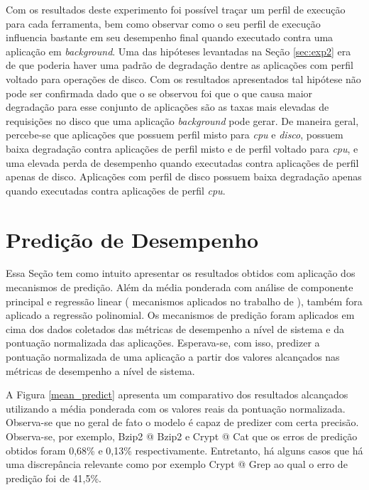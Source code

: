 Com os resultados deste experimento foi possível traçar um perfil de execução para cada ferramenta, bem como observar como o seu perfil de execução influencia bastante em seu desempenho final quando executado contra uma aplicação em \textit{background}. Uma das hipóteses levantadas na Seção \ref{sec:exp2} era de que poderia haver uma padrão de degradação dentre as aplicações com perfil voltado para operações de disco. Com os resultados apresentados tal hipótese não pode ser confirmada dado que o se observou foi que o que causa maior degradação para esse conjunto de aplicações são as taxas mais elevadas de requisições no disco que uma aplicação \textit{background} pode gerar. De maneira geral, percebe-se que aplicações que possuem perfil misto para \textit{cpu} e \textit{disco}, possuem baixa degradação contra aplicações de perfil misto e de perfil voltado para \textit{cpu}, e uma elevada perda de desempenho quando executadas contra aplicações de perfil apenas de disco. Aplicações com perfil de disco possuem baixa degradação apenas quando executadas contra aplicações de perfil \textit{cpu}. 

\section{Predição de Desempenho}
\label{sec:performance_predict} 
Essa Seção tem como intuito apresentar os resultados obtidos com aplicação dos mecanismos de predição. Além da média ponderada com análise de componente principal e regressão linear ( mecanismos aplicados no trabalho de ), também fora aplicado a regressão polinomial. Os mecanismos de predição foram aplicados em cima dos dados coletados das métricas de desempenho a nível de sistema e da pontuação normalizada das aplicações. Esperava-se, com isso, predizer a pontuação normalizada de uma aplicação a partir dos valores alcançados nas métricas de desempenho a nível de sistema. 

A Figura \ref{mean_predict} apresenta um comparativo dos resultados alcançados utilizando a média ponderada com os valores reais da pontuação normalizada. Observa-se que no geral de fato o modelo é capaz de predizer com certa precisão. Observa-se, por exemplo, Bzip2 @ Bzip2 e Crypt @ Cat que os erros de predição obtidos foram 0,68\% e 0,13\% respectivamente. Entretanto, há alguns casos que há uma discrepância relevante como por exemplo Crypt @ Grep ao qual o erro de predição foi de 41,5\%.
   
